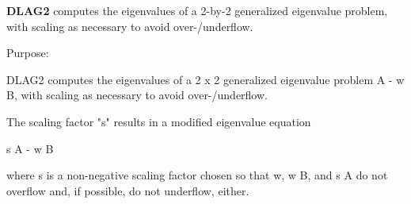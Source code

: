 {\bfseries D\+L\+A\+G2} computes the eigenvalues of a 2-\/by-\/2 generalized eigenvalue problem, with scaling as necessary to avoid over-\//underflow. 

 \begin{DoxyParagraph}{Purpose\+: }
\begin{DoxyVerb} DLAG2 computes the eigenvalues of a 2 x 2 generalized eigenvalue
 problem  A - w B, with scaling as necessary to avoid over-/underflow.

 The scaling factor "s" results in a modified eigenvalue equation

     s A - w B

 where  s  is a non-negative scaling factor chosen so that  w,  w B,
 and  s A  do not overflow and, if possible, do not underflow, either.\end{DoxyVerb}
 
\end{DoxyParagraph}

